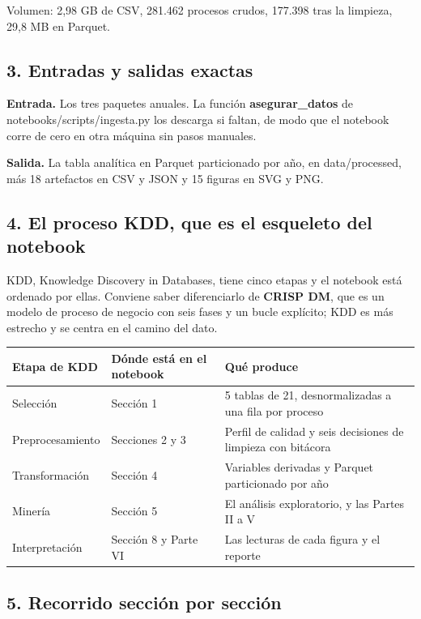 \documentclass[11pt]{article}
\begin{document}
Volumen: 2,98 GB de CSV, 281.462 procesos crudos, 177.398 tras la limpieza, 29,8 MB en Parquet.

\subsection*{3. Entradas y salidas exactas}
\textbf{Entrada.} Los tres paquetes anuales. La función \textbf{asegurar\_\allowbreak{}datos} de notebooks/scripts/ingesta.py los descarga si faltan, de modo que el notebook corre de cero en otra máquina sin pasos manuales.

\textbf{Salida.} La tabla analítica en Parquet particionado por año, en data/processed, más 18 artefactos en CSV y JSON y 15 figuras en SVG y PNG.

\subsection*{4. El proceso KDD, que es el esqueleto del notebook}
KDD, Knowledge Discovery in Databases, tiene cinco etapas y el notebook está ordenado por ellas. Conviene saber diferenciarlo de \textbf{CRISP DM}, que es un modelo de proceso de negocio con seis fases y un bucle explícito; KDD es más estrecho y se centra en el camino del dato.

\begin{center}\footnotesize
\begin{tabularx}{\linewidth}{Q{0.475}Q{0.743}Q{1.782}}
\toprule
\textbf{Etapa de KDD} & \textbf{Dónde está en el notebook} & \textbf{Qué produce} \\
\midrule
Selección & Sección 1 & 5 tablas de 21, desnormalizadas a una fila por proceso \\
Preprocesamiento & Secciones 2 y 3 & Perfil de calidad y seis decisiones de limpieza con bitácora \\
Transformación & Sección 4 & Variables derivadas y Parquet particionado por año \\
Minería & Sección 5 & El análisis exploratorio, y las Partes II a V \\
Interpretación & Sección 8 y Parte VI & Las lecturas de cada figura y el reporte \\
\bottomrule
\end{tabularx}
\end{center}
\subsection*{5. Recorrido sección por sección}
\end{document}
